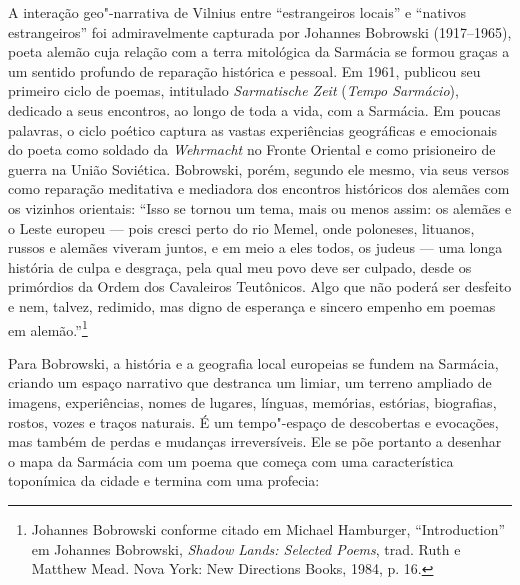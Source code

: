 A interação geo"-narrativa de Vilnius entre ``estrangeiros locais'' e
``nativos estrangeiros'' foi admiravelmente capturada por Johannes
Bobrowski (1917--1965), poeta alemão cuja relação com a terra mitológica
da Sarmácia se formou graças a um sentido profundo de reparação
histórica e pessoal. Em 1961, publicou seu primeiro ciclo de poemas,
intitulado \textit{Sarmatische Zeit} (\textit{Tempo Sarmácio}), dedicado a
seus encontros, ao longo de toda a vida, com a Sarmácia. Em poucas
palavras, o ciclo poético captura as vastas experiências geográficas e
emocionais do poeta como soldado da \textit{Wehrmacht} no Fronte Oriental
e como prisioneiro de guerra na União Soviética. Bobrowski, porém,
segundo ele mesmo, via seus versos como reparação meditativa e mediadora
dos encontros históricos dos alemães com os vizinhos orientais: ``Isso
se tornou um tema, mais ou menos assim: os alemães e o Leste europeu ---
pois cresci perto do rio Memel, onde poloneses, lituanos, russos e
alemães viveram juntos, e em meio a eles todos, os judeus --- uma longa
história de culpa e desgraça, pela qual meu povo deve ser culpado, desde
os primórdios da Ordem dos Cavaleiros Teutônicos. Algo que não poderá
ser desfeito e nem, talvez, redimido, mas digno de esperança e sincero
empenho em poemas em alemão.''\footnote{Johannes Bobrowski conforme citado em Michael Hamburger, ``Introduction'' em Johannes Bobrowski, \textit{Shadow Lands: Selected Poems}, trad. Ruth e Matthew Mead. Nova York: New Directions Books, 1984, p. 16.}

Para Bobrowski, a história e a geografia local europeias se fundem na
Sarmácia, criando um espaço narrativo que destranca um limiar, um
terreno ampliado de imagens, experiências, nomes de lugares, línguas,
memórias, estórias, biografias, rostos, vozes e traços naturais. É um
tempo"-espaço de descobertas e evocações, mas também de perdas e mudanças
irreversíveis. Ele se põe portanto a desenhar o mapa da Sarmácia com um
poema que começa com uma característica toponímica da cidade e termina
com uma profecia:

